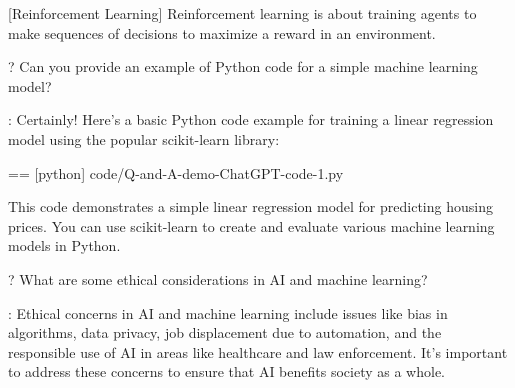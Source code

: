   [Reinforcement Learning]
    Reinforcement learning is about training agents to make sequences of decisions to maximize a reward in an environment.

?
  Can you provide an example of Python code for a simple machine learning model?

:
  Certainly! Here's a basic Python code example for training a linear regression model using the popular scikit-learn library:

  == [python] {code/Q-and-A-demo-ChatGPT-code-1.py}

  This code demonstrates a simple linear regression model for predicting housing prices. You can use scikit-learn to create and evaluate various machine learning models in Python.

?
  What are some ethical considerations in AI and machine learning?

:
  Ethical concerns in AI and machine learning include issues like bias in algorithms, data privacy, job displacement due to automation, and the responsible use of AI in areas like healthcare and law enforcement. It's important to address these concerns to ensure that AI benefits society as a whole.
